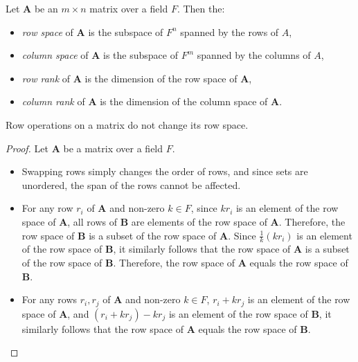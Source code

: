 \documentclass[12pt]{article}
\begin{document}
\begin{defn}
    Let $\boldsymbol{A}$ be an $m \times n$ matrix over a field $F$. Then the:
    \begin{itemize}
        \item \emph{row space} of $\boldsymbol{A}$ is the subspace of $F^n$ spanned by the rows of $A$,
        \item \emph{column space} of $\boldsymbol{A}$ is the subspace of $F^m$ spanned by the columns of $A$,
        \item \emph{row rank} of $\boldsymbol{A}$ is the dimension of the row space of $\boldsymbol{A}$,
        \item \emph{column rank} of $\boldsymbol{A}$ is the dimension of the column space of $\boldsymbol{A}$.
    \end{itemize}
\end{defn}

\begin{lemma}\label{row-ops-row-space}
    Row operations on a matrix do not change its row space.
\end{lemma}

\begin{proof}
    Let $\boldsymbol{A}$ be a matrix over a field $F$.
    \begin{itemize}
        \item Swapping rows simply changes the order of rows, and since sets are unordered, the span of the rows cannot be affected.
        \item For any row $r_i$ of $\boldsymbol{A}$ and non-zero $k \in F$, since $kr_i$ is an element of the row space of $\boldsymbol{A}$, all rows of $\boldsymbol{B}$ are elements of the row space of $\boldsymbol{A}$. Therefore, the row space of $\boldsymbol{B}$ is a subset of the row space of $\boldsymbol{A}$. Since $\frac{1}{k}(kr_i)$ is an element of the row space of $\boldsymbol{B}$, it similarly follows that the row space of $\boldsymbol{A}$ is a subset of the row space of $\boldsymbol{B}$. Therefore, the row space of $\boldsymbol{A}$ equals the row space of $\boldsymbol{B}$.
        \item For any rows $r_i, r_j$ of $\boldsymbol{A}$ and non-zero $k \in F$, $r_i + kr_j$ is an element of the row space of $\boldsymbol{A}$, and $(r_i + kr_j) - kr_j$ is an element of the row space of $\boldsymbol{B}$, it similarly follows that the row space of $\boldsymbol{A}$ equals the row space of $\boldsymbol{B}$.
    \end{itemize}
\end{proof}
\end{document}
